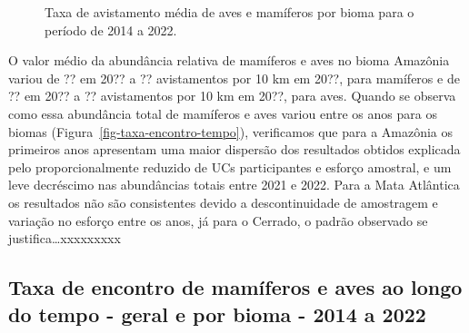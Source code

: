 \documentclass[
  letterpaper,
]{scrbook}
\begin{document}
\begin{figure}[H]


\caption{\label{fig-taxa-encontro-bioma}Taxa de avistamento média de
aves e mamíferos por bioma para o período de 2014 a 2022.}

\end{figure}%

O valor médio da abundância relativa de mamíferos e aves no bioma
Amazônia variou de ?? em 20?? a ?? avistamentos por 10 km em 20??, para
mamíferos e de ?? em 20?? a ?? avistamentos por 10 km em 20??, para
aves. Quando se observa como essa abundância total de mamíferos e aves
variou entre os anos para os biomas
(Figura~\ref{fig-taxa-encontro-tempo}), verificamos que para a Amazônia
os primeiros anos apresentam uma maior dispersão dos resultados obtidos
explicada pelo proporcionalmente reduzido de UCs participantes e esforço
amostral, e um leve decréscimo nas abundâncias totais entre 2021 e 2022.
Para a Mata Atlântica os resultados não são consistentes devido a
descontinuidade de amostragem e variação no esforço entre os anos, já
para o Cerrado, o padrão observado se justifica\ldots xxxxxxxxx

\subsection{Taxa de encontro de mamíferos e aves ao longo do tempo -
geral e por bioma - 2014 a
2022}\label{taxa-de-encontro-de-mamuxedferos-e-aves-ao-longo-do-tempo---geral-e-por-bioma---2014-a-2022}
\end{document}
